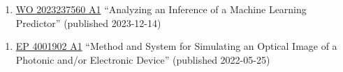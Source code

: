 
\newcommand{\patentref}[5]{\href{#4}{#1 #2} ``#3'' (granted #5)}
\newcommand{\patentpubref}[5]{\href{#4}{#1 #2} ``#3'' (published #5)}

{
    \ifdefined\shortcv
        {}
    \else
        {
            \begin{enumerate}
                \item [] \patentpubref{WO}
                                        {2023237560 A1}
                                        {Analyzing an Inference of a Machine Learning Predictor}
                                        {https://patentimages.storage.googleapis.com/3d/6c/b6/935e952fe109fa/WO2023237560A1.pdf}
                                        {2023-12-14}
            \end{enumerate}
        }
    \fi
}

{
    \ifdefined\shortcv
        {}
    \else
        {
            \begin{enumerate}
                \item [] \patentpubref{EP}
                                        {4001902 A1}
                                        {Method and System for Simulating an Optical Image of a Photonic and/or Electronic Device}
                                        {https://patentimages.storage.googleapis.com/36/85/0c/89e60111328058/EP4001902A1.pdf}
                                        {2022-05-25}
            \end{enumerate}
        }
    \fi
}


